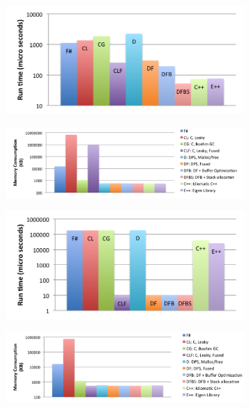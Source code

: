 \begin{figure}[t]
\begin{subfigure}[t]{.38\textwidth}
\includegraphics[width=\columnwidth]{results/proj_runtime.png}
\label{fig:runtime_ba}
\end{subfigure}
\hfill
\begin{subfigure}[t]{.58\textwidth}
\includegraphics[width=\columnwidth]{results/proj_mem.png}
\label{fig:mem_ba}
\end{subfigure}
\begin{subfigure}[t]{.38\textwidth}
\includegraphics[width=\columnwidth]{results/gmm_runtime.png}
\label{fig:runtime_gmm}
\end{subfigure}
\hfill
\begin{subfigure}[t]{.58\textwidth}
\includegraphics[width=\columnwidth]{results/gmm_mem.png}

\end{subfigure}
\end{figure}
